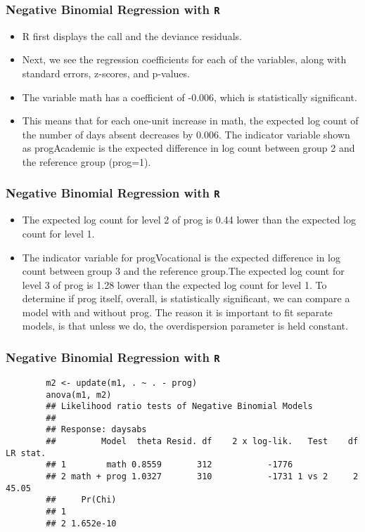 \documentclass[00-GLMregslides.tex]{subfiles}
\begin{document}
\begin{frame}[fragile]
	\frametitle{Negative Binomial Regression with \texttt{R} }
	\Large
	\begin{itemize}
	\item R first displays the call and the deviance residuals. 
	\item Next, we see the regression coefficients for each of the variables, along with standard errors, z-scores, 
	and p-values. 
	\item The variable math has a coefficient of -0.006, which is statistically significant.
	\item This means that for each one-unit increase in math, the expected log count of the number of days absent decreases by 0.006. The indicator variable shown as progAcademic is the expected difference in log count between group 2 and the reference group (prog=1). 
	\end{itemize}
\end{frame}
\begin{frame}[fragile]
	\frametitle{Negative Binomial Regression with \texttt{R} }
	\Large
		\begin{itemize}
	\item 
	The expected log count for level 2 of prog is 0.44 lower than the expected log count for level 1. 
	\item The indicator variable for progVocational is the expected difference in log count between group 3 and the reference group.The expected log count for level 3 of prog is 1.28 lower than the expected log count for level 1. To determine if prog itself, overall, is statistically significant, we can compare a model with and without prog. The reason it is important to fit separate models, is that unless we do, the overdispersion parameter is held constant.
	\end{itemize}
\end{frame}
\begin{frame}[fragile]
	\frametitle{Negative Binomial Regression with \texttt{R} }
	\large
	\begin{framed}
		\begin{verbatim}	
		m2 <- update(m1, . ~ . - prog)
		anova(m1, m2)
		## Likelihood ratio tests of Negative Binomial Models
		## 
		## Response: daysabs
		##         Model  theta Resid. df    2 x log-lik.   Test    df LR stat.
		## 1        math 0.8559       312           -1776                      
		## 2 math + prog 1.0327       310           -1731 1 vs 2     2    45.05
		##     Pr(Chi)
		## 1          
		## 2 1.652e-10
		\end{verbatim}
	\end{framed}
\end{frame}
\end{document}
